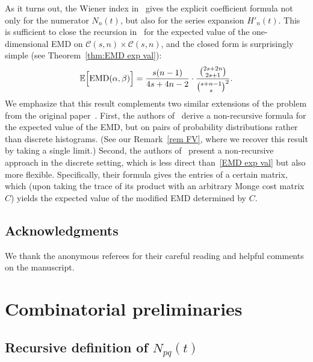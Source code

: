 \documentclass[11pt]{amsart}
\theoremstyle{plain}
\theoremstyle{definition}
\numberwithin{equation}{section}
\newcommand{\C}{\mathcal{C}}
\newcommand{\EMD}{{\rm EMD}}
\begin{document}
As it turns out, the Wiener index in~\cite{Defant} gives the explicit coefficient formula not only for the numerator $N_n(t)$, but also for the series expansion $H'_{n}(t)$.
This is sufficient to close the recursion in~\cite{BW} for the expected value of the one-dimensional EMD on $\C(s,n) \times \C(s,n)$, and the closed form is surprisingly simple (see Theorem~\ref{thm:EMD exp val}):
\begin{equation}
\label{EMD exp val}
    \mathbb{E}\Big[\EMD(\alpha,\beta)\Big] = \frac{s(n-1)}{4s+4n-2} \cdot \frac{\binom{2s+2n}{2s+1}}{\binom{s+n-1}{s}^2}.
\end{equation}
We emphasize that this result complements two similar extensions of the problem from the original paper~\cite{BW}.
First, the authors of~\cite{FV} derive a non-recursive formula for the expected value of the EMD, but on pairs of probability distributions rather than discrete histograms.  (See our Remark~\ref{rem FV}, where we recover this result by taking a single limit.)
Second, the authors of~\cite{EK23} present a non-recursive approach in the discrete setting, which is less direct than~\eqref{EMD exp val} but also more flexible.
Specifically, their formula gives the entries of a certain matrix, which (upon taking the trace of its product with an arbitrary Monge cost matrix $C$) yields the expected value of the modified EMD determined by $C$.

\subsection*{Acknowledgments}

We thank the anonymous referees for their careful reading and helpful comments on the manuscript.

\section{Combinatorial preliminaries}

\subsection{Recursive definition of $N_{pq}(t)$}
\label{sub:Npq recursion}
\end{document}
